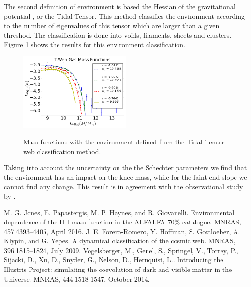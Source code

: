 \documentclass[preprint,proceedings]{rmaa}
\begin{document}
The second definition of environment is based 
the Hessian of the gravitational potential \citep{Forero}, or
the Tidal Tensor.
This method classifies the environment according to the number of
eigenvalues of this tensor which are larger than a given threshod. 
The classification is done into voids, filaments, sheets and
clusters. 
Figure \ref{fig2} shows the results for this environment
classification.


\begin{figure}[h!]
\centering
\includegraphics[width=0.5\textwidth]{environment2}
\label{fig2}
\caption{Mass functions with the environment defined from the Tidal
  Tensor web classification method.}
\centering
\end{figure}

 Taking into account the uncertainty on the the Schechter parameters
 we find  that the environment has an impact on the knee-mass,
 while for the faint-end slope we cannot find any change.
 This result is in agreement with the observational study by
\citealp{Jones}.


\begin{thebibliography}
 M. G. Jones, E. Papastergis, M. P. Haynes, and R. Giovanelli. Environmental dependence of the H I mass function in the ALFALFA 70\% catalogue. MNRAS, 457:4393–4405, April 2016.
 J. E. Forero-Romero, Y. Hoffman, S. Gottloeber, A. Klypin, and G. Yepes. A dynamical classification of the cosmic web. MNRAS, 396:1815–1824, July 2009.
Vogelsberger, M., {Genel}, S.,
  {Springel}, V., {Torrey}, P.,  {Sijacki}, D., {Xu}, D.,
  {Snyder}, G., {Nelson}, D., {Hernquist}, L.. Introducing the
  Illustris Project: simulating the coevolution of dark and visible
  matter in the Universe. MNRAS, 444:1518-1547, October 2014.
\end{thebibliography}
\end{document}
